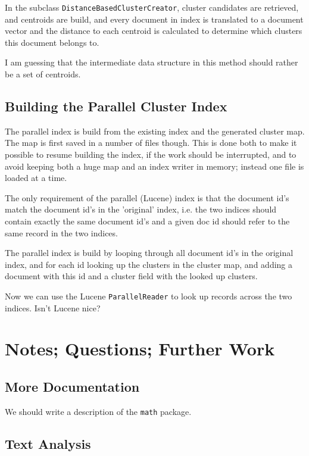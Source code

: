 \documentclass[a4paper,12pt]{article}
\begin{document}
In the subclass \texttt{DistanceBasedClusterCreator}, cluster
candidates are retrieved, and centroids are build, and every document in
index is translated to a document vector and the distance to each
centroid is calculated to determine which clusters this document
belongs to.

I am guessing that the intermediate data structure in this method
should rather be a set of centroids.

\subsection{Building the Parallel Cluster Index}

The parallel index is build from the existing index and the generated
cluster map. The map is first saved in a number of files though. This
is done both to make it possible to resume building the index, if the
work should be interrupted, and to avoid keeping both a huge map and
an index writer in memory; instead one file is loaded at a time.

The only requirement of the parallel (Lucene) index is that the
document id's match the document id's in the 'original' index,
i.e. the two indices should contain exactly the same document id's and
a given doc id should refer to the same record in the two indices.

The parallel index is build by looping through all document id's in
the original index, and for each id looking up the clusters in the
cluster map, and adding a document with this id and a cluster field
with the looked up clusters.

Now we can use the Lucene \texttt{ParallelReader} to look up records
across the two indices. Isn't Lucene nice?

\section{Notes; Questions; Further Work}

\subsection{More Documentation}

We should write a description of the \texttt{math} package.

\subsection{Text Analysis}
\end{document}
